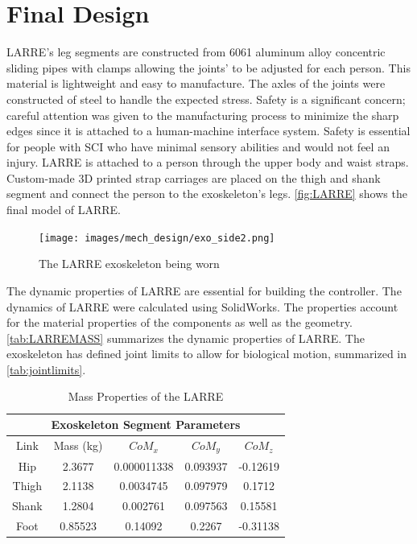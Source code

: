 \section{Final Design}

LARRE's leg segments are constructed from 6061 aluminum alloy concentric sliding pipes with clamps allowing the joints' to be adjusted for each person. This material is lightweight and easy to manufacture. The axles of the joints were constructed of steel to handle the expected stress. Safety is a significant concern; careful attention was given to the manufacturing process to minimize the sharp edges since it is attached to a human-machine interface system. Safety is essential for people with SCI who have minimal sensory abilities and would not feel an injury.  LARRE is attached to a person through the upper body and waist straps. Custom-made 3D printed strap carriages are placed on the thigh and shank segment and connect the person to the exoskeleton's legs. \autoref{fig:LARRE} shows the final model of LARRE.     


\begin{figure}
    \centering
    \texttt{[image: images/mech\_design/exo\_side2.png]}
    \caption{The LARRE exoskeleton being worn}
    \label{fig:LARRE}
\end{figure}


The dynamic properties of LARRE are essential for building the controller. The dynamics of LARRE were calculated using SolidWorks. The properties account for the material properties of the components as well as the geometry. \autoref{tab:LARREMASS} summarizes the dynamic properties of LARRE. The exoskeleton has defined joint limits to allow for biological motion, summarized in \autoref{tab:jointlimits}.

\begin{table}[h!]
    \centering
    \begin{tabular}{|c c c c c|}  
         \hline 
          \multicolumn{5}{|c|}{Exoskeleton Segment Parameters} \\
         \hline
         Link & Mass (kg) & $CoM_x$ & $CoM_y$ & $CoM_z$ \\
         \hline \hline
         Hip & 2.3677 & 0.000011338 & 0.093937 &  -0.12619 \\
         Thigh & 2.1138 & 0.0034745   & 0.097979 &  0.1712 \\
         Shank & 1.2804  &   0.002761 & 0.097563   & 0.15581\\
         Foot & 0.85523 & 0.14092 & 0.2267 &  -0.31138  \\
         \hline
    \end{tabular}    
    \caption[Dynamic Properties of the LARRE]{Mass Properties of the LARRE}
    \label{tab:LARREMASS}
\end{table}


